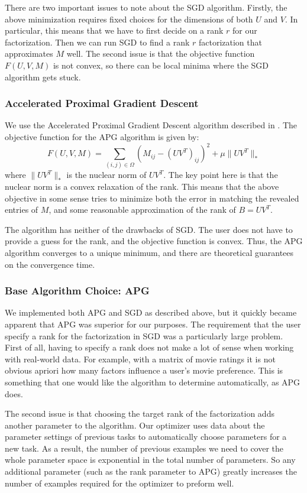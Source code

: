 There are two important issues to note about the SGD algorithm. Firstly, the above minimization requires fixed choices for the dimensions of both $U$ and $V$. In particular, this means that we have to first decide on a rank $r$ for our factorization. Then we can run SGD to find a rank $r$ factorization that approximates $M$ well. The second issue is that the objective function $F(U,V,M)$ is not convex, so there can be local minima where the SGD algorithm gets stuck.

\subsubsection{Accelerated Proximal Gradient Descent}
We use the Accelerated Proximal Gradient Descent algorithm described in \cite{APGPaper}. The objective function for the APG algorithm is given by:
\[
F(U,V,M) = \sum_{(i,j)\in \Omega} \left(M_{ij} - (UV^T)_{ij}\right)^2 + \mu \| UV^T\|_*
\]
where $\|UV^T\|_*$ is the nuclear norm of $UV^T$. The key point here is that the nuclear norm is a convex relaxation of the rank. This means that the above objective in some sense tries to minimize both the error in matching the revealed entries of $M$, and some reasonable approximation of the rank of $B=UV^T$.

The algorithm has neither of the drawbacks of SGD. The user does not have to provide a guess for the rank, and the objective function is convex. Thus, the APG algorithm converges to a unique minimum, and there are theoretical guarantees on the convergence time.

\subsubsection{Base Algorithm Choice: APG}
We implemented both APG and SGD as described above, but it quickly became apparent that APG was superior for our purposes. The requirement that the user specify a rank for the factorization in SGD was a particularly large problem. First of all, having to specify a rank does not make a lot of sense when working with real-world data. For example, with a matrix of movie ratings it is not obvious apriori how many factors influence a user's movie preference. This is something that one would like the algorithm to determine automatically, as APG does.

The second issue is that choosing the target rank of the factorization adds another parameter to the algorithm. Our optimizer uses data about the parameter settings of previous tasks to automatically choose parameters for a new task. As a result, the number of previous examples we need to cover the whole parameter space is exponential in the total number of parameters. So any additional parameter (such as the rank parameter to APG) greatly increases the number of examples required for the optimizer to preform well.

